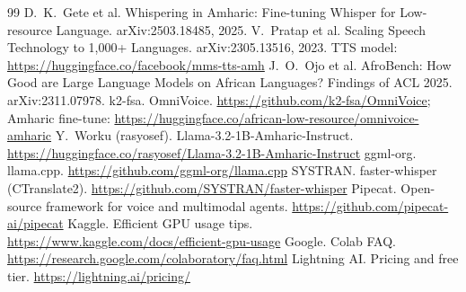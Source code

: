 \begin{thebibliography}{99}
 D.~K.~Gete et al. Whispering in Amharic: Fine-tuning Whisper for Low-resource Language. arXiv:2503.18485, 2025.
 V.~Pratap et al. Scaling Speech Technology to 1,000+ Languages. arXiv:2305.13516, 2023. TTS model: \url{https://huggingface.co/facebook/mms-tts-amh}
 J.~O.~Ojo et al. AfroBench: How Good are Large Language Models on African Languages? Findings of ACL 2025. arXiv:2311.07978.
 k2-fsa. OmniVoice. \url{https://github.com/k2-fsa/OmniVoice}; Amharic fine-tune: \url{https://huggingface.co/african-low-resource/omnivoice-amharic}
 Y.~Worku (rasyosef). Llama-3.2-1B-Amharic-Instruct. \url{https://huggingface.co/rasyosef/Llama-3.2-1B-Amharic-Instruct}
 ggml-org. llama.cpp. \url{https://github.com/ggml-org/llama.cpp}
 SYSTRAN. faster-whisper (CTranslate2). \url{https://github.com/SYSTRAN/faster-whisper}
 Pipecat. Open-source framework for voice and multimodal agents. \url{https://github.com/pipecat-ai/pipecat}
 Kaggle. Efficient GPU usage tips. \url{https://www.kaggle.com/docs/efficient-gpu-usage}
 Google. Colab FAQ. \url{https://research.google.com/colaboratory/faq.html}
 Lightning AI. Pricing and free tier. \url{https://lightning.ai/pricing/}
\end{thebibliography}
